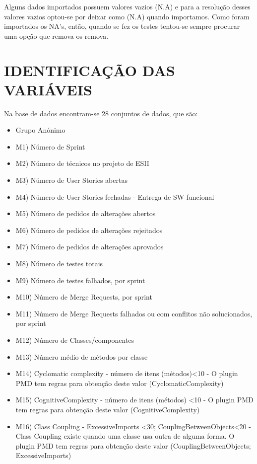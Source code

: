 \documentclass[%
 aip,
cp,  %
 amsmath,amssymb,%
 reprint,%
]{revtex4-2}
\begin{document}
Alguns dados importados possuem valores vazios (N.A) e para a resolução desses valores vazios optou-se por deixar como (N.A) quando importamos. Como foram importados os NA's, então, quando se fez os testes tentou-se sempre procurar uma opção que remova os remova.  



\section{IDENTIFICAÇÃO DAS VARIÁVEIS \label{sec:simulation}  } 

Na base de dados encontram-se 28 conjuntos de dados, que são: 
\begin{itemize}
    \item Grupo Anónimo 
    \item M1) Número de Sprint
    \item M2) Número de técnicos no projeto de ESII
    \item M3) Número de User Stories abertas
    \item M4) Número de User Stories fechadas - Entrega de SW funcional 
    \item M5) Número de pedidos de alterações abertos
    \item M6) Número de pedidos de alterações rejeitados
    \item M7) Número de pedidos de alterações aprovados 
    \item M8) Número de testes totais
    \item M9) Número de testes falhados, por sprint
    \item M10) Número de Merge Requests, por sprint
    \item M11) Número de Merge Requests falhados ou com conflitos não solucionados, por sprint
    \item M12) Número de Classes/componentes
    \item M13) Número médio de métodos por classe 
    \item M14) Cyclomatic complexity - número de itens (métodos)<10 - O plugin PMD tem regras para obtenção deste valor (CyclomaticComplexity)
    \item M15) CognitiveComplexity - número de itens (métodos) <10 - O plugin PMD tem regras para obtenção deste valor (CognitiveComplexity)
    \item M16) Class Coupling - ExcessiveImports <30; CouplingBetweenObjects<20 - Class Coupling existe quando uma classe usa outra de alguma forma. O plugin PMD tem regras para obtenção deste valor (CouplingBetweenObjects; ExcessiveImports)

\end{itemize}
\end{document}
